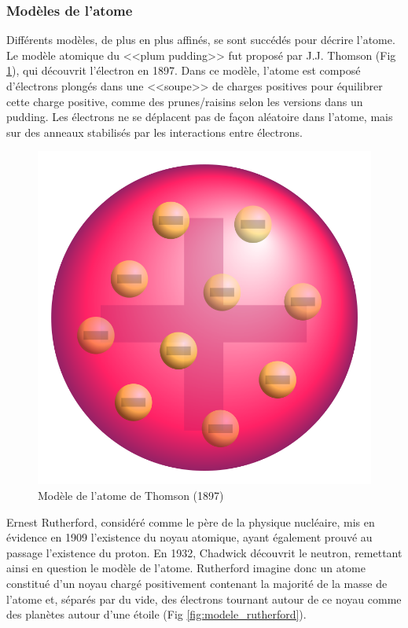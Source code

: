\subsubsection{Modèles de l'atome}
Différents modèles, de plus en plus affinés, se sont succédés pour décrire l'atome. Le modèle atomique du <<plum pudding>> fut proposé par J.J. Thomson (Fig \ref{fig:modele_thompson}), qui découvrit l'électron en 1897. Dans ce modèle, l'atome est composé d'électrons plongés dans une <<soupe>> de charges positives pour équilibrer cette charge positive, comme des prunes/raisins selon les versions dans un pudding. Les électrons ne se déplacent pas de façon aléatoire dans l'atome, mais sur des anneaux stabilisés par les interactions entre électrons.

\begin{figure}[ht]
    \centering
    \includegraphics[scale=0.15]{Images1/thomson.png}
    \caption{Modèle de l'atome de Thomson (1897)}
    \label{fig:modele_thompson}
\end{figure}

Ernest Rutherford, considéré comme le père de la physique nucléaire, mis en évidence en 1909 l'existence du noyau atomique, ayant également prouvé au passage l'existence du proton. En 1932, Chadwick découvrit le neutron, remettant ainsi en question le modèle de l'atome. Rutherford imagine donc un atome constitué d'un noyau chargé positivement contenant la majorité de la masse de l'atome et, séparés par du vide, des électrons tournant autour de ce noyau comme des planètes autour d'une étoile (Fig \ref{fig:modele_rutherford}).

